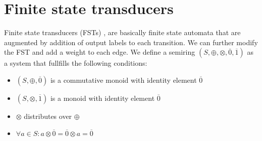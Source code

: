 \section{Finite state transducers}
\label{fst-desc}
Finite state transducers (FSTs) \cite{mohri1997finite}, are basically finite state automata that are augmented by addition of output labels to each transition.
We can further modify the FST and add a weight to each edge.
We define a semiring $(S,\oplus,\otimes,\overline{0},\overline{1})$ as a system that fullfills the following conditions:
\begin{nobreak}
\begin{itemize}
\item $(S,\oplus,\overline{0})$ is a commutative monoid with identity element $\overline{0}$
\item $(S,\otimes,\overline{1})$ is a monoid with identity element $\overline{0}$
\item $\otimes $ distributes over $\oplus$
\item $\forall a \in S: a \otimes \overline{0} = \overline{0} \otimes a = \overline{0}$
\end{itemize}
\end{nobreak}

